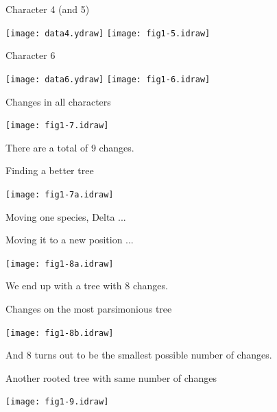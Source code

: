 \documentclass[bluish,slideColor,colorBG,pdf]{prosper}
\begin{document}
\begin{slide}[Replace]{Character 4 (and 5)}

\centerline{\texttt{[image: data4.ydraw]} \hspace{0.5in} \texttt{[image: fig1-5.idraw]}}

\end{slide}

\begin{slide}[Replace]{Character 6}

\centerline{\texttt{[image: data6.ydraw]} \hspace{0.5in} \texttt{[image: fig1-6.idraw]}}

\end{slide}

\begin{slide}[Replace]{Changes in all characters}
\bigskip

\centerline{\texttt{[image: fig1-7.idraw]}}

\centerline{There are a total of 9 changes.}

\end{slide}

\begin{slide}[Replace]{Finding a better tree}
\bigskip

\centerline{\texttt{[image: fig1-7a.idraw]}}

Moving one species, Delta ...

\end{slide}

\begin{slide}[Replace]{Moving it to a new position ... }
\bigskip

\centerline{\texttt{[image: fig1-8a.idraw]}}

We end up with a tree with 8 changes.

\end{slide}

\begin{slide}[Replace]{Changes on the most parsimonious tree}
\bigskip

\centerline{\texttt{[image: fig1-8b.idraw]}}

And 8 turns out to be the smallest possible number of changes.

\end{slide}

\begin{slide}[Replace]{Another rooted tree with same number of changes}
\bigskip

\centerline{\texttt{[image: fig1-9.idraw]}}

\end{slide}
\end{document}
